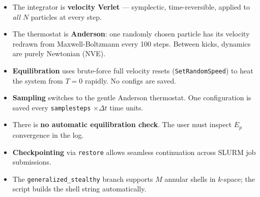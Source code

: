 \documentclass[12pt,a4paper]{article}
\begin{document}
\begin{itemize}
    \item The integrator is \textbf{velocity Verlet} --- symplectic,
          time-reversible, applied to \emph{all} $N$ particles at every step.
    \item The thermostat is \textbf{Anderson}: one randomly chosen particle
          has its velocity redrawn from Maxwell-Boltzmann every 100 steps.
          Between kicks, dynamics are purely Newtonian (NVE).
    \item \textbf{Equilibration} uses brute-force full velocity resets
          (\texttt{SetRandomSpeed}) to heat the system from $T=0$ rapidly.
          No configs are saved.
    \item \textbf{Sampling} switches to the gentle Anderson thermostat.
          One configuration is saved every \texttt{samplesteps} $\times \Delta t$
          time units.
    \item There is \textbf{no automatic equilibration check}. The user must
          inspect $E_p$ convergence in the log.
    \item \textbf{Checkpointing} via \texttt{restore} allows seamless
          continuation across SLURM job submissions.
    \item The \texttt{generalized\_stealthy} branch supports $M$ annular
          shells in $k$-space; the script builds the shell string automatically.
\end{itemize}
\end{document}
